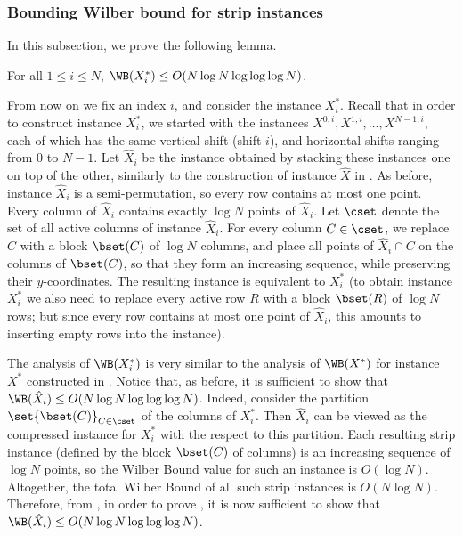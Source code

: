 \documentclass{toc}
\begin{document}
\subsubsection{Bounding Wilber bound for strip instances}
In this subsection, we prove the following lemma.

\begin{lemma}\label{lem: bounding vertical WB for strip}
	For all $1\leq i\leq N$, $\WB(X^*_i)\leq O(N\log N\log\log\log N)$.
\end{lemma}

From now on we fix an index $i$, and consider the instance $X^*_i$. 
Recall that in order to construct instance $X^*_i$, we started with the instances $X^{0,i},X^{1,i},\ldots,X^{N-1,i}$, each of which has the same vertical shift (shift $i$), and horizontal shifts ranging from $0$ to $N-1$. Let $\hat X_i$ be the instance obtained by stacking these instances one on top of the other, similarly to the construction of instance $\hat X$ in . As before, instance $\hat X_i$ is a semi-permutation, so every row contains at most one point. Every column of $\hat X_i$ contains exactly $\log N$ points of $\hat X_i$. Let $\cset$ denote the set of all active columns of instance $\hat X_i$. For every column $C\in \cset$, we replace $C$ with a block $\bset(C)$ of $\log N$ columns, and place all points of $\hat X_i\cap C$ on the columns of $\bset(C)$, so that they form an increasing sequence, while preserving their $y$-coordinates. The resulting instance is equivalent to $X^*_i$ (to obtain instance $X^*_i$ we also need to replace every active row $R$ with a block $\bset(R)$ of $\log N$ rows; but since every row contains at most one point of $\hat X_i$, this amounts to inserting empty rows into the instance).

The analysis of $\WB(X^*_i)$ is very similar to the analysis of $\WB(X^*)$ for instance $X^*$ constructed in . Notice that, as before, it is sufficient to show that $\WB(\hat X_i)\leq  O(N\log N\log\log\log N)$.
Indeed, consider the partition $\set{\bset(C)}_{C\in \cset}$ of the columns of $X^*_i$. Then $\hat X_i$ can be viewed as the compressed instance for $X^*_i$ with the respect to this partition. Each resulting strip instance (defined by the block $\bset(C)$ of columns) is an increasing sequence of $\log N$ points, so the Wilber Bound value for such an instance is $O(\log N)$. Altogether, the total Wilber Bound of all such strip instances is $O(N\log N)$. Therefore, from , in order to prove , it is now sufficient to show that $\WB(\hat X_i)\leq O(N\log N\log\log\log N)$.
\end{document}
